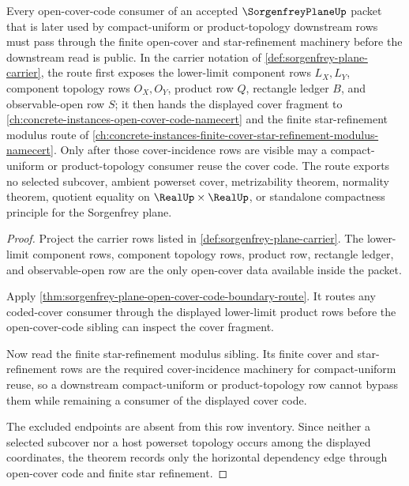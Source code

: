 \begin{theorem}\label{thm:sorgenfrey-plane-open-cover-code-forward-lattice-link}
Every open-cover-code consumer of an accepted $\SorgenfreyPlaneUp$ packet that is later used by compact-uniform or product-topology downstream rows must pass through the finite open-cover and star-refinement machinery before the downstream read is public. In the carrier notation of \autoref{def:sorgenfrey-plane-carrier}, the route first exposes the lower-limit component rows $L_X,L_Y$, component topology rows $O_X,O_Y$, product row $Q$, rectangle ledger $B$, and observable-open row $S$; it then hands the displayed cover fragment to \autoref{ch:concrete-instances-open-cover-code-namecert} and the finite star-refinement modulus route of \autoref{ch:concrete-instances-finite-cover-star-refinement-modulus-namecert}. Only after those cover-incidence rows are visible may a compact-uniform or product-topology consumer reuse the cover code. The route exports no selected subcover, ambient powerset cover, metrizability theorem, normality theorem, quotient equality on $\RealUp\times\RealUp$, or standalone compactness principle for the Sorgenfrey plane.
\end{theorem}
\begin{proof}
Project the carrier rows listed in \autoref{def:sorgenfrey-plane-carrier}. The lower-limit component rows, component topology rows, product row, rectangle ledger, and observable-open row are the only open-cover data available inside the packet.

Apply \autoref{thm:sorgenfrey-plane-open-cover-code-boundary-route}. It routes any coded-cover consumer through the displayed lower-limit product rows before the open-cover-code sibling can inspect the cover fragment.

Now read the finite star-refinement modulus sibling. Its finite cover and star-refinement rows are the required cover-incidence machinery for compact-uniform reuse, so a downstream compact-uniform or product-topology row cannot bypass them while remaining a consumer of the displayed cover code.

The excluded endpoints are absent from this row inventory. Since neither a selected subcover nor a host powerset topology occurs among the displayed coordinates, the theorem records only the horizontal dependency edge through open-cover code and finite star refinement.
\end{proof}
